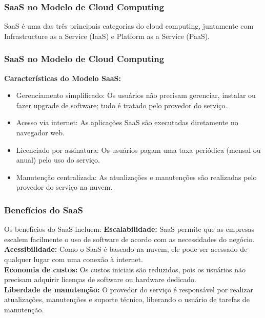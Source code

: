 \documentclass{beamer}
\begin{document}
\begin{frame}
	\frametitle{SaaS no Modelo de Cloud Computing}

	SaaS é uma das três principais categorias do cloud computing, juntamente com Infrastructure as a Service (IaaS) e Platform as a Service (PaaS).



\end{frame}
\begin{frame}
	\frametitle{SaaS no Modelo de Cloud Computing}

	\textbf{Características do Modelo SaaS:}
	\begin{itemize}
		\item Gerenciamento simplificado: Os usuários não precisam gerenciar, instalar ou fazer upgrade de software; tudo é tratado pelo provedor do serviço.
		\item Acesso via internet: As aplicações SaaS são executadas diretamente no navegador web.
		\item Licenciado por assinatura: Os usuários pagam uma taxa periódica (mensal ou anual) pelo uso do serviço.
		\item Manutenção centralizada: As atualizações e manutenções são realizadas pelo provedor do serviço na nuvem.
	\end{itemize}


\end{frame}
\begin{frame}
	\frametitle{Benefícios do SaaS}

	Os benefícios do SaaS incluem:
	\linebreak
	\linebreak
	\textbf{Escalabilidade:} SaaS permite que as empresas escalem facilmente o uso de software de acordo com as necessidades do negócio.\\
	\textbf{Acessibilidade:} Como o SaaS é baseado na nuvem, ele pode ser acessado de qualquer lugar com uma conexão à internet.\\
	
	\textbf{Economia de custos:} Os custos iniciais são reduzidos, pois os usuários não precisam adquirir licenças de software ou hardware dedicado.\\
	\textbf{Liberdade de manutenção:} O provedor do serviço é responsável por realizar atualizações, manutenções e suporte técnico, liberando o usuário de tarefas de manutenção.


\end{frame}
\end{document}
